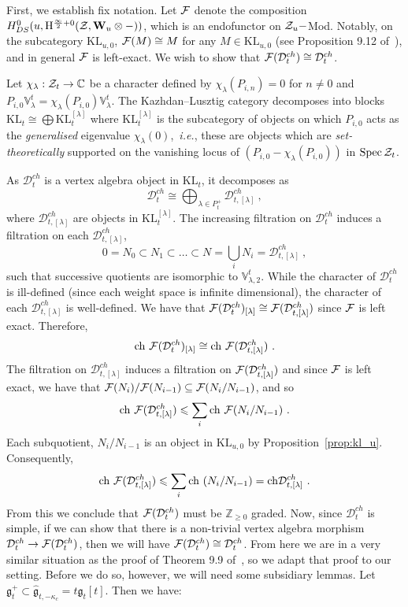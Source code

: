 \documentclass[a4paper]{article}
\def\IC{\mathbb{C}}
\def\IV{\mathbb{V}}
\def\IZ{\mathbb{Z}}
\def\FF{{\cal F}}
\def\ZZ{{\cal Z}}
\def\ch{{\rm ch}}
\def\gf{\mathfrak{g}}
\def \ie{{\it i.e.}}
\def \KL{\mathrm{KL}}
\newcommand{\Hi}[1]{\mathrm{H}^{\frac{\infty}{2}+#1}}
\def\D{\mathcal{D}^{ch}}
\def\W{\mathbf{W}}
\begin{document}
First, we establish fix notation. Let $\FF$ denote the composition $H^0_{DS}(u,\Hi{0}(\ZZ,\W_u\otimes-))$, which is an endofunctor on $\ZZ_u-$Mod. Notably, on the subcategory $\KL_{u,0}$, $\FF(M)\cong M$ for any $M\in \KL_{u,0}$ (see Proposition 9.12 of~\cite{Arakawa:2018egx}), and in general $\FF$ is left-exact. We wish to show that $\FF(\D_t)\cong \D_t$.

Let $\chi_\lambda:\ZZ_t\rightarrow \IC$ be a character defined by $\chi_\lambda(P_{i,n})=0$ for $n\neq0$ and $P_{i,0}\IV^t_\lambda = \chi_\lambda(P_{i,0})\IV^t_\lambda$. The Kazhdan--Lusztig category decomposes into blocks $\KL_t\cong \bigoplus \KL_t^{[\lambda]}$ where $\KL_t^{[\lambda]}$ is the subcategory of objects on which $P_{i,0}$ acts as the \textit{generalised} eigenvalue $\chi_\lambda(0)$,~\ie, these are objects which are \textit{set-theoretically} supported on the vanishing locus of $(P_{i,0}-\chi_\lambda(P_{i,0}))$ in $\mathrm{Spec}\, \ZZ_t$.

As $\D_t$ is a vertex algebra object in $\KL_t$, it decomposes as
\begin{equation*}
	\D_t \cong \bigoplus_{\lambda\in P^+_t}\D_{t,[\lambda]}~,
\end{equation*}
where $\D_{t,[\lambda]}$ are objects in $\KL_t^{[\lambda]}$. The increasing filtration on $\D_t$ induces a filtration on each $\D_{t,[\lambda]}$,
\begin{equation*}
	0= N_0 \subset N_1 \subset \dots \subset N = \bigcup_{i} N_i = \D_{t,[\lambda]}~,
\end{equation*}
such that successive quotients are isomorphic to $\IV_{\lambda,2}^t$. While the character of $\D_t$ is ill-defined (since each weight space is infinite dimensional), the character of each $\D_{t,[\lambda]}$ is well-defined. We have that $\FF(\D_t)_{[\lambda]} \cong \FF(\D_{t,[\lambda]})$ since $\FF$ is left exact. Therefore,
\begin{equation*}
	\ch~ \FF(\D_t)_{[\lambda]} \cong \ch~ \FF(\D_{t,[\lambda]})~.
\end{equation*}
The filtration on $\D_{t,[\lambda]}$ induces a filtration on $\FF(\D_{t,[\lambda]})$ and since $\FF$ is left exact, we have that $\FF(N_{i})/\FF(N_{i-1}) \subseteq \FF(N_{i}/N_{i-1})$, and so
\begin{equation*}
	\ch~\FF(\D_{t,[\lambda]}) \leqslant \sum_i \ch~\FF(N_{i}/N_{i-1})~.
\end{equation*}
Each subquotient, $N_i/N_{i-1}$ is an object in $\KL_{u,0}$ by Proposition~\ref{prop:kl_u}. Consequently,
\begin{equation*}
	\ch~\FF(\D_{t,[\lambda]}) \leqslant \sum_i \ch~(N_{i}/N_{i-1}) = \ch \D_{t,[\lambda]}~.
\end{equation*}
From this we conclude that $\FF(\D_t)$ must be $\IZ_{\geqslant0}$ graded. Now, since $\D_t$ is simple, if we can show that there is a non-trivial vertex algebra morphism $\D_t\rightarrow \FF(\D_t)$, then we will have $\FF(\D_t)\cong \D_t$. From here we are in a very similar situation as the proof of Theorem 9.9 of~\cite{Arakawa:2018egx}, so we adapt that proof to our setting. Before we do so, however, we will need some subsidiary lemmas. Let $\gf^+_t\subset \hat{\gf}_{t,-\kappa_c}= t\gf_t[t]$. Then we have:
\end{document}
